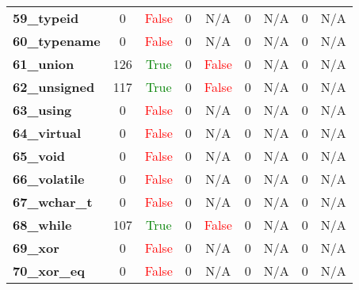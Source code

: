 \documentclass{article}
\begin{document}
\begin{xltabular}{\textwidth}{lcccccccc}
\textbf{59\_typeid}& 0&\textcolor{red}{False}& 0&N/A& 0&N/A& 0&N/A \\[0.5ex]
\textbf{60\_typename}& 0&\textcolor{red}{False}& 0&N/A& 0&N/A& 0&N/A \\[0.5ex]
\textbf{61\_union}& 126&\textcolor{green}{True}& 0&\textcolor{red}{False}& 0&N/A& 0&N/A \\[0.5ex]
\textbf{62\_unsigned}& 117&\textcolor{green}{True}& 0&\textcolor{red}{False}& 0&N/A& 0&N/A \\[0.5ex]
\textbf{63\_using}& 0&\textcolor{red}{False}& 0&N/A& 0&N/A& 0&N/A \\[0.5ex]
\textbf{64\_virtual}& 0&\textcolor{red}{False}& 0&N/A& 0&N/A& 0&N/A \\[0.5ex]
\textbf{65\_void}& 0&\textcolor{red}{False}& 0&N/A& 0&N/A& 0&N/A \\[0.5ex]
\textbf{66\_volatile}& 0&\textcolor{red}{False}& 0&N/A& 0&N/A& 0&N/A \\[0.5ex]
\textbf{67\_wchar\_t}& 0&\textcolor{red}{False}& 0&N/A& 0&N/A& 0&N/A \\[0.5ex]
\textbf{68\_while}& 107&\textcolor{green}{True}& 0&\textcolor{red}{False}& 0&N/A& 0&N/A \\[0.5ex]
\textbf{69\_xor}& 0&\textcolor{red}{False}& 0&N/A& 0&N/A& 0&N/A \\[0.5ex]
\textbf{70\_xor\_eq}& 0&\textcolor{red}{False}& 0&N/A& 0&N/A& 0&N/A \\[0.5ex]
\bottomrule
\end{xltabular}
\newpage
\end{document}
